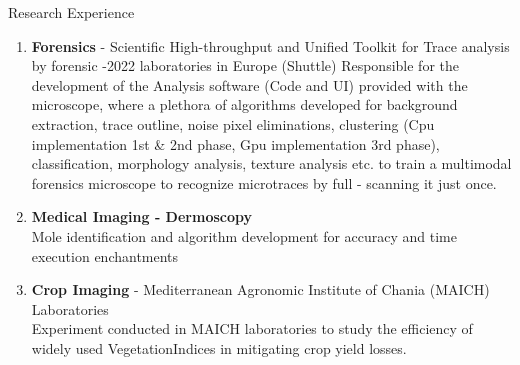 \documentclass{resume} %
\begin{document}
\begin{rSection}{Research Experience}
    \vspace*{1\baselineskip}
    \begin{enumerate}[label=\textbullet]
        \item \textbf{Forensics} - Scientific High-throughput and Unified Toolkit for Trace analysis by forensic \hfill{-2022} laboratories in Europe (Shuttle)\newline
        Responsible for the development of the Analysis software (Code and UI) provided with the microscope, where a plethora of algorithms developed for background extraction, trace outline, noise pixel eliminations, clustering (Cpu implementation 1st \& 2nd phase, Gpu implementation 3rd phase), classification, morphology analysis, texture analysis etc. to train a multimodal forensics microscope to recognize  microtraces by full - scanning it just once. 
        
        \item \textbf{Medical Imaging - Dermoscopy} \hfill   {}
    \\ {\normalfont Mole identification and algorithm development for accuracy and time execution enchantments}\par
    
        \item \textbf{Crop Imaging} - Mediterranean Agronomic Institute of Chania (MAICH) Laboratories\hfill{}
    \\ {\normalfont Experiment conducted in MAICH laboratories to study the efficiency of widely used Vegetation\newline Indices in mitigating crop yield losses.}
    \vspace*{1\baselineskip}
    \end{enumerate}
    \par
    
    
    
\end{rSection}

\end{document}
